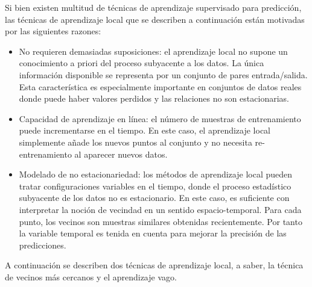 \documentclass{llncs}
\begin{document}
Si bien existen multitud de técnicas de aprendizaje supervisado para predicción, las técnicas de aprendizaje local que se describen a continuación están motivadas por las siguientes razones:
\begin{itemize}

\item No requieren demasiadas suposiciones: el aprendizaje local no supone un conocimiento a priori del proceso subyacente a los datos. La única información disponible se representa por un conjunto de pares entrada/salida. Esta característica es especialmente importante en conjuntos de datos reales donde puede haber valores perdidos y las relaciones no son estacionarias. 

\item Capacidad de aprendizaje en línea: el número de muestras de entrenamiento puede incrementarse en el tiempo. En este caso, el aprendizaje local simplemente añade los nuevos puntos al conjunto y no necesita re-entrenamiento al aparecer nuevos datos.

\item Modelado de no estacionariedad: los métodos de aprendizaje local pueden tratar configuraciones variables en el tiempo, donde el proceso estadístico subyacente de los datos no es estacionario. En este caso, es suficiente con interpretar la noción de vecindad en un sentido espacio-temporal. Para cada punto, los vecinos son muestras similares obtenidas recientemente. Por tanto la variable temporal es tenida en cuenta para mejorar la precisión de las predicciones.
\end{itemize}
A continuación se describen dos técnicas de aprendizaje local, a saber, la técnica de vecinos más cercanos y el aprendizaje vago.
\end{document}
